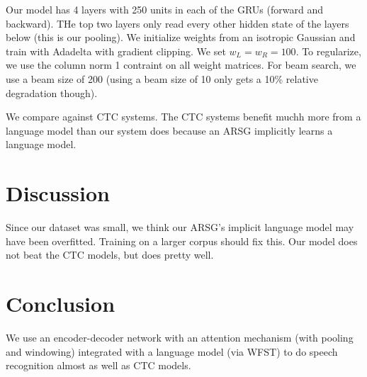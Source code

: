 \documentclass[a4paper]{article}
\begin{document}
Our model has 4 layers with 250 units in each of the GRUs
(forward and backward). THe top two layers only read every other hidden
state of the layers below (this is our pooling). We initialize weights
from an isotropic Gaussian and train with Adadelta with gradient clipping.
We set $w_L = w_R = 100$. To regularize, we use the column norm 1 contraint
on all weight matrices. For beam search, we use a beam size of 200 (using
a beam size of 10 only gets a 10\% relative degradation though).

We compare against CTC systems. The CTC systems benefit muchh more from a
language model than our system does because an ARSG implicitly learns
a language model.

\section{Discussion}
Since our dataset was small, we think our ARSG's implicit language model may
have been overfitted. Training on a larger corpus should fix this. Our
model does not beat the CTC models, but does pretty well.

\section{Conclusion}
We use an encoder-decoder network with an attention mechanism (with pooling
and windowing) integrated with a language model (via WFST) to do speech
recognition almost as well as CTC models.
\end{document}
